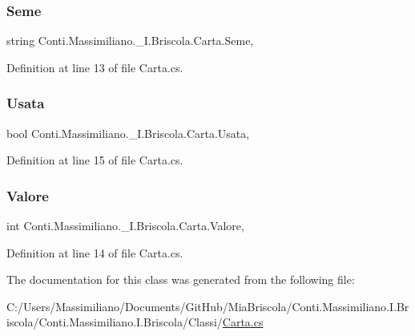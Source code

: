 \subsubsection{\texorpdfstring{Seme}{Seme}}
{\footnotesize\ttfamily string Conti.\+Massimiliano.\+\_\+I.\+Briscola.\+Carta.\+Seme\hspace{0.3cm}{\ttfamily [get]}, {\ttfamily [set]}}



Definition at line 13 of file Carta.\+cs.

\hypertarget{class_conti_1_1_massimiliano_1_1__5_i_1_1_briscola_1_1_carta_ae3a4512c09eae0e33d1fa3397b0d0854}{}\label{class_conti_1_1_massimiliano_1_1__5_i_1_1_briscola_1_1_carta_ae3a4512c09eae0e33d1fa3397b0d0854} 
\subsubsection{\texorpdfstring{Usata}{Usata}}
{\footnotesize\ttfamily bool Conti.\+Massimiliano.\+\_\+I.\+Briscola.\+Carta.\+Usata\hspace{0.3cm}{\ttfamily [get]}, {\ttfamily [set]}}



Definition at line 15 of file Carta.\+cs.

\hypertarget{class_conti_1_1_massimiliano_1_1__5_i_1_1_briscola_1_1_carta_aa8d7102545896d6787425afe8ba38410}{}\label{class_conti_1_1_massimiliano_1_1__5_i_1_1_briscola_1_1_carta_aa8d7102545896d6787425afe8ba38410} 
\subsubsection{\texorpdfstring{Valore}{Valore}}
{\footnotesize\ttfamily int Conti.\+Massimiliano.\+\_\+I.\+Briscola.\+Carta.\+Valore\hspace{0.3cm}{\ttfamily [get]}, {\ttfamily [set]}}



Definition at line 14 of file Carta.\+cs.



The documentation for this class was generated from the following file\+:\begin{DoxyCompactItemize}
\item 
C\+:/\+Users/\+Massimiliano/\+Documents/\+Git\+Hub/\+Mia\+Briscola/\+Conti.\+Massimiliano.\+I.\+Briscola/\+Conti.\+Massimiliano.\+I.\+Briscola/\+Classi/\hyperlink{_carta_8cs}{Carta.\+cs}\end{DoxyCompactItemize}
